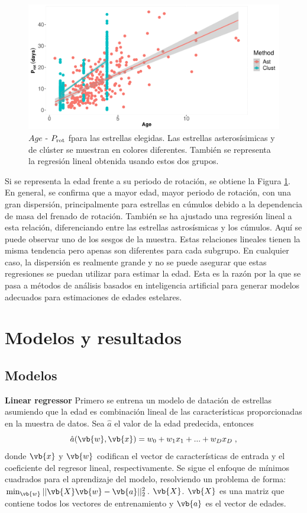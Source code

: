 \begin{figure}[t]
\begin{center}
 \includegraphics[width=0.8\linewidth]{Figuras/Age_Prot_embedded.pdf}
\end{center}
\caption{$Age$ - $P_{\rm rot}$ fpara las estrellas elegidas. Las estrellas asterosísimicas y de clúster se muestran en colores diferentes. También se representa la regresión lineal obtenida usando estos dos grupos.}
 \label{Fig:Age_rot}
\end{figure}

Si se representa la edad frente a su periodo de rotación, se obtiene la Figura \ref{Fig:Age_rot}. En general, se confirma que a mayor edad, mayor periodo de rotación, con una gran dispersión, principalmente para estrellas en cúmulos debido a la dependencia de masa del frenado de rotación. También se ha ajustado una regresión lineal a esta relación, diferenciando entre las estrellas astrosísmicas y los cúmulos. Aquí se puede observar uno de los sesgos de la muestra. Estas relaciones lineales tienen la misma tendencia pero apenas son diferentes para cada subgrupo. En cualquier caso, la dispersión es realmente grande y no se puede asegurar que estas regresiones se puedan utilizar para estimar la edad. Esta es la razón por la que se pasa a métodos de análisis basados en inteligencia artificial para generar modelos adecuados para estimaciones de edades estelares.


\chapter{Modelos y resultados} 

\section{Modelos}
\label{sec:models}

\textbf{Linear regressor} {} Primero se entrena un modelo de datación de estrellas asumiendo que la edad es combinación lineal de las características proporcionadas en la muestra de datos. Sea $\hat{a}$ el valor de la edad predecida, entonces
\begin{equation}
\hat{a}(\vb{w}, \vb{x}) = w_0 + w_1 x_1 + ... + w_D x_D \; ,
\end{equation}
donde $\vb{x}$ y $\vb{w}$ codifican el vector de características de entrada y el coeficiente del regresor lineal, respectivamente. Se sigue el enfoque de mínimos cuadrados para el aprendizaje del modelo, resolviendo un problema de forma: $\min_{\vb{w}} || \vb{X} \vb{w} - \vb{a}||_2^2$. $\vb{X}$. $\vb{X}$ es una matriz que contiene todos los vectores de entrenamiento y $\vb{a}$ es el vector de edades.

